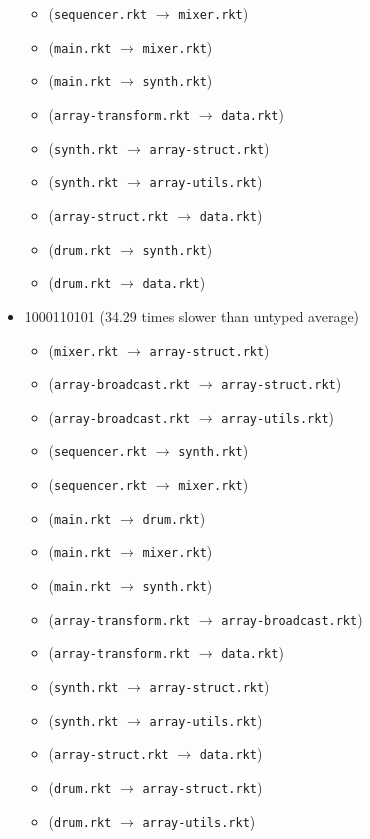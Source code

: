 \documentclass{article}
\newcommand{\mono}[1]{\texttt{#1}}
\begin{document}
\begin{itemize}
\begin{itemize}
  \item (\mono{sequencer.rkt} $\rightarrow$ \mono{mixer.rkt})
  \item (\mono{main.rkt} $\rightarrow$ \mono{mixer.rkt})
  \item (\mono{main.rkt} $\rightarrow$ \mono{synth.rkt})
  \item (\mono{array-transform.rkt} $\rightarrow$ \mono{data.rkt})
  \item (\mono{synth.rkt} $\rightarrow$ \mono{array-struct.rkt})
  \item (\mono{synth.rkt} $\rightarrow$ \mono{array-utils.rkt})
  \item (\mono{array-struct.rkt} $\rightarrow$ \mono{data.rkt})
  \item (\mono{drum.rkt} $\rightarrow$ \mono{synth.rkt})
  \item (\mono{drum.rkt} $\rightarrow$ \mono{data.rkt})
  \end{itemize}
\item 1000110101 (34.29 times slower than untyped average)
  \begin{itemize}
  \item (\mono{mixer.rkt} $\rightarrow$ \mono{array-struct.rkt})
  \item (\mono{array-broadcast.rkt} $\rightarrow$ \mono{array-struct.rkt})
  \item (\mono{array-broadcast.rkt} $\rightarrow$ \mono{array-utils.rkt})
  \item (\mono{sequencer.rkt} $\rightarrow$ \mono{synth.rkt})
  \item (\mono{sequencer.rkt} $\rightarrow$ \mono{mixer.rkt})
  \item (\mono{main.rkt} $\rightarrow$ \mono{drum.rkt})
  \item (\mono{main.rkt} $\rightarrow$ \mono{mixer.rkt})
  \item (\mono{main.rkt} $\rightarrow$ \mono{synth.rkt})
  \item (\mono{array-transform.rkt} $\rightarrow$ \mono{array-broadcast.rkt})
  \item (\mono{array-transform.rkt} $\rightarrow$ \mono{data.rkt})
  \item (\mono{synth.rkt} $\rightarrow$ \mono{array-struct.rkt})
  \item (\mono{synth.rkt} $\rightarrow$ \mono{array-utils.rkt})
  \item (\mono{array-struct.rkt} $\rightarrow$ \mono{data.rkt})
  \item (\mono{drum.rkt} $\rightarrow$ \mono{array-struct.rkt})
  \item (\mono{drum.rkt} $\rightarrow$ \mono{array-utils.rkt})

\end{itemize}
\end{itemize}
\end{document}
